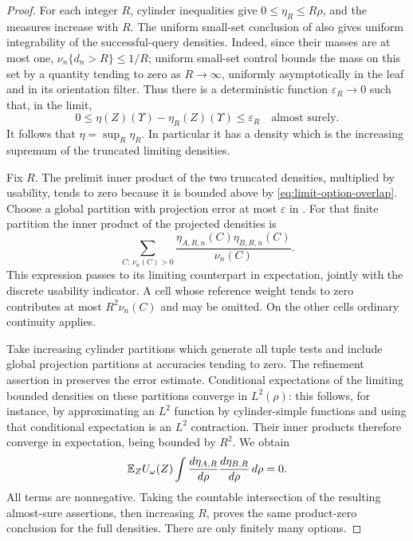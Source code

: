 \begin{proof}
For each integer $R$, cylinder inequalities give
$0\le\eta_R\le R\rho$, and the measures increase with $R$.
The uniform small-set conclusion of 
also gives uniform integrability of the successful-query densities.
Indeed, since their masses are at most one,
$\nu_n\{d_n>R\}\le1/R$; uniform small-set control bounds the mass on
this set by a quantity tending to zero as $R\to\infty$, uniformly
asymptotically in the leaf and in its orientation filter. Thus there is
a deterministic function $\varepsilon_R\to0$ such that, in the limit,
\[
0\le\eta(Z)(\Upsilon)-\eta_R(Z)(\Upsilon)\le\varepsilon_R
\quad\text{almost surely}.
\]
It follows that $\eta=\sup_R\eta_R$. In particular it has a density
which is the increasing supremum of the truncated limiting densities.

Fix $R$. The prelimit inner product of the two truncated densities,
multiplied by usability, tends to zero because it is bounded above by
\eqref{eq:limit-option-overlap}. Choose a global partition with projection
error at most $\varepsilon$ in
. For that finite partition the inner
product of the projected densities is
\[
\sum_{C:\,\nu_n(C)>0}
 \frac{\eta_{A,R,n}(C)\eta_{B,R,n}(C)}{\nu_n(C)}.
\]
This expression passes to its limiting counterpart in expectation,
jointly with the discrete usability indicator. A cell whose reference
weight tends to zero contributes at most $R^2\nu_n(C)$ and may be
omitted. On the other cells ordinary continuity applies.

Take increasing cylinder partitions which generate all tuple tests and
include global projection partitions at accuracies tending to zero.
The refinement assertion in  preserves
the error estimate. Conditional expectations of the limiting bounded
densities on these partitions converge in $L^2(\rho)$: this follows,
for instance, by approximating an $L^2$ function by cylinder-simple
functions and using that conditional expectation is an $L^2$
contraction. Their inner products therefore converge in expectation,
being bounded by $R^2$. We obtain
\[
\mathbb E_Z U_\omega(Z)
 \int \frac{d\eta_{A,R}}{d\rho}
          \frac{d\eta_{B,R}}{d\rho}\,d\rho=0.
\]
All terms are nonnegative. Taking the countable intersection of the
resulting almost-sure assertions, then increasing $R$, proves the same
product-zero conclusion for the full densities. There are only finitely
many options.
\end{proof}

